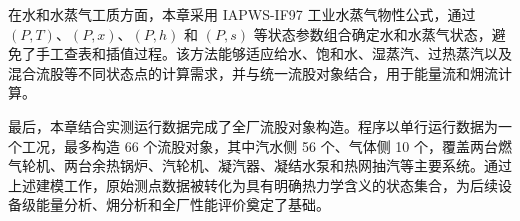 在水和水蒸气工质方面，本章采用 IAPWS-IF97 工业水蒸气物性公式，通过 \((P,T)\)、\((P,x)\)、\((P,h)\) 和 \((P,s)\) 等状态参数组合确定水和水蒸气状态，避免了手工查表和插值过程。该方法能够适应给水、饱和水、湿蒸汽、过热蒸汽以及混合流股等不同状态点的计算需求，并与统一流股对象结合，用于能量流和㶲流计算。

最后，本章结合实测运行数据完成了全厂流股对象构造。程序以单行运行数据为一个工况，最多构造 66 个流股对象，其中汽水侧 56 个、气体侧 10 个，覆盖两台燃气轮机、两台余热锅炉、汽轮机、凝汽器、凝结水泵和热网抽汽等主要系统。通过上述建模工作，原始测点数据被转化为具有明确热力学含义的状态集合，为后续设备级能量分析、㶲分析和全厂性能评价奠定了基础。
